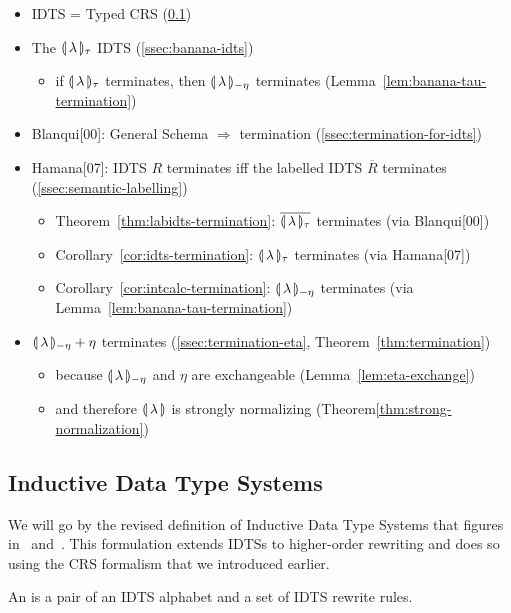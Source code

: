 \begin{itemize}
\item IDTS = Typed CRS (\ref{ssec:idts})
\item The ${\llparenthesis \, \lambda \, \rrparenthesis_\tau}$ IDTS (\ref{ssec:banana-idts})
  \begin{itemize}
  \item if ${\llparenthesis \, \lambda \, \rrparenthesis_\tau}$ terminates, then ${\llparenthesis \, \lambda \, \rrparenthesis_{-\eta}}$ terminates
    (Lemma~\ref{lem:banana-tau-termination})
  \end{itemize}
\item Blanqui[00]: General Schema $\Rightarrow$ termination
  (\ref{ssec:termination-for-idts})
\item Hamana[07]: IDTS $R$ terminates iff the labelled IDTS $\overline{R}$
  terminates (\ref{ssec:semantic-labelling})
  \begin{itemize}
  \item Theorem~\ref{thm:labidts-termination}: ${\overline{\llparenthesis \, \lambda \, \rrparenthesis_\tau}}$ terminates (via
    Blanqui[00])
  \item Corollary~\ref{cor:idts-termination}: ${\llparenthesis \, \lambda \, \rrparenthesis_\tau}$ terminates (via Hamana[07])
  \item Corollary~\ref{cor:intcalc-termination}: ${\llparenthesis \, \lambda \, \rrparenthesis_{-\eta}}$ terminates (via
    Lemma~\ref{lem:banana-tau-termination})
  \end{itemize}
\item ${\llparenthesis \, \lambda \, \rrparenthesis_{-\eta}} + \eta$ terminates (\ref{ssec:termination-eta},
  Theorem~\ref{thm:termination})
  \begin{itemize}
  \item because ${\llparenthesis \, \lambda \, \rrparenthesis_{-\eta}}$ and $\eta$ are exchangeable
    (Lemma~\ref{lem:eta-exchange})
  \item and therefore ${\llparenthesis \, \lambda \, \rrparenthesis}$ is strongly normalizing
    (Theorem\ref{thm:strong-normalization})
  \end{itemize}
\end{itemize}


\subsection{Inductive Data Type Systems}
\label{ssec:idts}

We will go by the revised definition of Inductive Data Type Systems that
figures in~\cite{blanqui2000termination} and~\cite{hamana2007higher}. This
formulation extends IDTSs to higher-order rewriting and does so using the
CRS formalism that we introduced earlier.

\begin{definition}
  An  is a pair of an IDTS alphabet
  and a set of IDTS rewrite rules.
\end{definition}

